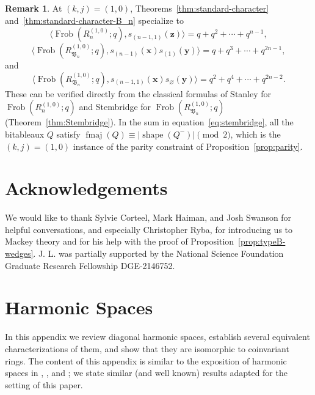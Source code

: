 \documentclass[12pt]{amsart}
\theoremstyle{plain}
\theoremstyle{definition}
\newtheorem{remark}[theorem]{Remark}
\DeclareMathOperator{\shape}{shape}
\DeclareMathOperator{\fmaj}{fmaj}
\DeclareMathOperator{\Frob}{Frob}
\newcommand{\x}{\mathbf{x}}
\newcommand{\y}{\mathbf{y}}
\newcommand{\z}{\mathbf{z}}
\begin{document}
\begin{remark}\label{rem:one-zero-specialization}
    At $(k,j) = (1,0)$, Theorems~\ref{thm:standard-character} and~\ref{thm:standard-character-B_n} specialize to
    \begin{equation}
        \langle \Frob(R_n^{(1,0)}; q), s_{(n-1,1)}(\z) \rangle = q + q^2 + \cdots + q^{n-1},
    \end{equation}
    \begin{equation}
        \langle \Frob(R_{\mathfrak{B}_n}^{(1,0)}; q), s_{(n-1)}(\x)s_{(1)}(\y) \rangle = q + q^3 + \cdots + q^{2n-1}, 
    \end{equation}
    and
    \begin{equation}
        \langle \Frob(R_{\mathfrak{B}_n}^{(1,0)}; q), s_{(n-1,1)}(\x)s_{\varnothing}(\y) \rangle = q^2 + q^4 + \cdots + q^{2n-2}.
    \end{equation}
    These can be verified directly from the classical formulas of Stanley \cite{MR526968} for $\Frob(R_n^{(1,0)}; q)$ and Stembridge for $\Frob(R_{\mathfrak{B}_n}^{(1,0)}; q)$ (Theorem~\ref{thm:Stembridge}).
    In the sum in equation~\eqref{eq:stembridge}, all the bitableaux $Q$ satisfy $\fmaj(Q) \equiv |\shape(Q^-)| \pmod{2}$, which is the $(k,j) = (1,0)$ instance of the parity constraint of Proposition~\ref{prop:parity}.
\end{remark}

\section*{Acknowledgements}
We would like to thank Sylvie Corteel, Mark Haiman, and Josh Swanson for helpful conversations, and especially Christopher Ryba, for introducing us to Mackey theory and for his help with the proof of Proposition~\ref{prop:typeB-wedges}.
J. L. was partially supported by the National Science Foundation Graduate Research Fellowship DGE-2146752. 

\appendix
\section{Harmonic Spaces}\label{sec:harmonic}

In this appendix we review diagonal harmonic spaces, establish several equivalent characterizations of them, and show that they are isomorphic to coinvariant rings. 
The content of this appendix is similar to the exposition of harmonic spaces in \cite[Section 1.3]{Haiman1994}, \cite{SwansonPreprint}, and \cite{SwansonWallach1}; we state similar (and well known) results adapted for the setting of this paper.
\end{document}
